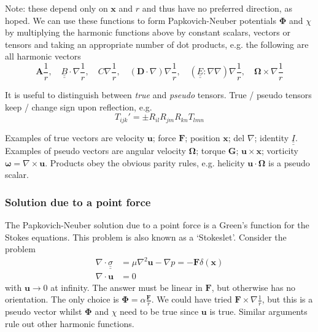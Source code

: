 \documentclass{jknotes}
\newcommand{\dunder}[1]{\underline{\underline{#1}}}
\newcommand{\x}{\bm{x}}
\newcommand{\inv}[1]{\frac{1}{#1}}
\begin{document}
Note: these depend only on $\x$ and $r$ and thus have no preferred direction,
as hoped. We can use these functions to form Papkovich-Neuber potentials
$\bm{\Phi}$ and $\chi$ by multiplying the harmonic functions above by constant
scalars, vectors or tensors and taking an appropriate number of dot products,
e.g. the following are all harmonic vectors
\begin{equation}
	\bm{A} \inv{r}, \hspace{1em} \dunder{B} \cdot \nabla \inv{r},
	\hspace{1em} C \nabla \inv{r}, \hspace{1em} (\bm{D} \cdot \nabla)\nabla
	\inv{r}, \hspace{1em} (\dunder{E}:\nabla\nabla)\nabla\inv{r}, \hspace{1em}
	\bm{\Omega} \times \nabla \inv{r}
\end{equation}

It is useful to distinguish between \emph{true} and \emph{pseudo} tensors.
True / pseudo tensors keep / change sign upon reflection, e.g.
\begin{equation}
	T_{ijk}' = \pm R_{il} R_{jm} R_{kn} T_{lmn}
\end{equation}

Examples of true vectors are velocity $\bm{u}$; force $\bm{F}$; position $\x$;
 del $\nabla$; identity $\dunder{I}$.
Examples of pseudo vectors are angular velocity $\bm{\Omega}$; torque
$\bm{G}$; $\bm{u} \times \x$; vorticity $\bm{\omega} = \nabla \times \bm{u}$.
Products obey the obvious parity rules, e.g. helicity $\bm{u} \cdot
\bm{\Omega}$ is a pseudo scalar.

\subsubsection{Solution due to a point force}
The Papkovich-Neuber solution due to a point force is a Green's function for
the Stokes equations. This problem is also known as a `Stokeslet'. Consider
the problem
\begin{equation}
	\begin{aligned}
		\nabla \cdot \dunder{\sigma} &= \mu \nabla^2 \bm{u} - \nabla p = -
		\bm{F} \delta(\x) \\
		\nabla \cdot \bm{u} &= 0
	\end{aligned}
\end{equation}
with $\bm{u} \to 0$ at infinity. The answer must be linear in $\bm{F}$, but
otherwise has no orientation. The only choice is $\bm{\Phi} = \alpha
\frac{\bm{F}}{r}$. We could have tried $\bm{F} \times \nabla \inv{r}$, but
this is a pseudo vector whilst $\bm{\Phi}$ and $\chi$ need to be true since
$\bm{u}$ is true. Similar arguments rule out other harmonic functions.
\end{document}
